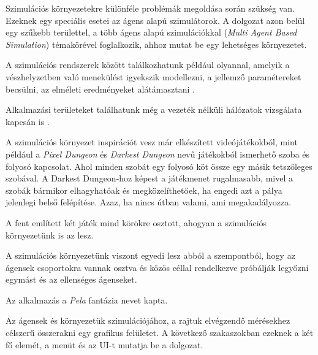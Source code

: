 

Szimulációs környezetekre különféle problémák megoldása során szükség van. Ezeknek egy speciális esetei az ágens alapú szimulátorok. A dolgozat azon belül egy szűkebb területtel, a több ágens alapú szimulációkkal (\textit{Multi Agent Based Simulation}) témakörével foglalkozik, ahhoz mutat be egy lehetséges környezetet.

A szimulációs rendszerek között találkozhatunk például olyannal, amelyik a vészhelyzetben való menekülést igyekszik modellezni, a jellemző paramétereket becsülni, az elméleti eredményeket alátámasztani \cite{zoumpoulaki2010multi}.

Alkalmazási területeket találhatunk még a vezeték nélküli hálózatok vizsgálata kapcsán is \cite{niazi2010novel}.


A szimulációs környezet inspirációt vesz már elkészített videójátékokból, mint például a \textit{Pixel Dungeon} \cite{pixeldungeon} és \textit{Darkest Dungeon} \cite{darkestdungeon} 
nevű játékokból ismerhető szoba és folyosó kapcsolat. Ahol minden szobát egy folyosó köt össze egy másik tetszőleges szobával.
A Darkest Dungeon-hoz képest a játékmenet rugalmasabb, mivel a szobák bármikor elhagyhatóak és megközelíthetőek, ha engedi azt a pálya jelenlegi belső felépítése.
Azaz, ha nincs útban valami, ami megakadályozza.

A fent említett két játék mind körökre osztott, ahogyan a szimulációs környezetünk is az lesz.

A szimulációs környezetünk viszont egyedi lesz abból a szempontból, hogy az ágensek csoportokra vannak osztva és közös céllal
rendelkezve próbálják legyőzni egymást és az ellenséges ágenseket.

Az alkalmazás a \textit{Pela} fantázia nevet kapta.


Az ágensek és környezetük szimulációjához, a rajtuk elvégzendő mérésekhez célszerű összerakni egy grafikus felületet. A következő szakaszokban ezeknek a két fő elemét, a menüt és az UI-t mutatja be a dolgozat.

